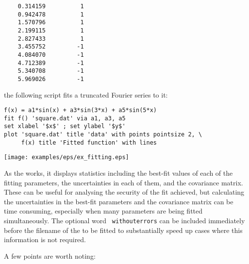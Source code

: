 \begin{verbatim}
    0.314159          1
    0.942478          1
    1.570796          1
    2.199115          1
    2.827433          1
    3.455752         -1
    4.084070         -1
    4.712389         -1
    5.340708         -1
    5.969026         -1
\end{verbatim}

\noindent the following script fits a truncated Fourier series to it:

\begin{verbatim}
f(x) = a1*sin(x) + a3*sin(3*x) + a5*sin(5*x)
fit f() 'square.dat' via a1, a3, a5
set xlabel '$x$' ; set ylabel '$y$'
plot 'square.dat' title 'data' with points pointsize 2, \
     f(x) title 'Fitted function' with lines
\end{verbatim}

\begin{center}
\texttt{[image: examples/eps/ex\_fitting.eps]}
\end{center}

As the  works, it displays statistics including the best-fit
values of each of the fitting parameters, the uncertainties in each of them,
and the covariance matrix. These can be useful for analysing the security of
the fit achieved, but calculating the uncertainties in the best-fit parameters
and the covariance matrix can be time consuming, especially when many
parameters are being fitted simultaneously. The optional word {\tt
withouterrors} can be included immediately before the filename of the \datafile
to be fitted to substantially speed up cases where this information is not
required.

A few points are worth noting:

